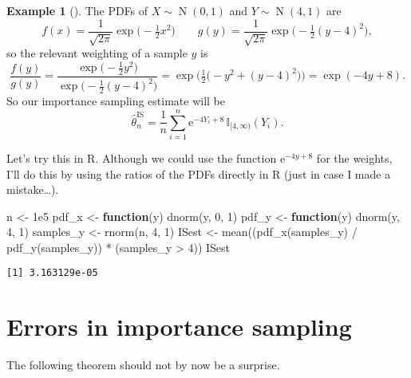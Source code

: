 \documentclass[
  letterpaper,
  DIV=11,
  numbers=noendperiod]{scrreprt}
\newenvironment{Shaded}{\begin{snugshade}}{\end{snugshade}}
\newcommand{\ControlFlowTok}[1]{\textcolor[rgb]{0.00,0.23,0.31}{\textbf{#1}}}
\newcommand{\DecValTok}[1]{\textcolor[rgb]{0.68,0.00,0.00}{#1}}
\newcommand{\FloatTok}[1]{\textcolor[rgb]{0.68,0.00,0.00}{#1}}
\newcommand{\FunctionTok}[1]{\textcolor[rgb]{0.28,0.35,0.67}{#1}}
\newcommand{\NormalTok}[1]{\textcolor[rgb]{0.00,0.23,0.31}{#1}}
\newcommand{\OtherTok}[1]{\textcolor[rgb]{0.00,0.23,0.31}{#1}}
\newcommand{\SpecialCharTok}[1]{\textcolor[rgb]{0.37,0.37,0.37}{#1}}
\theoremstyle{plain}
\theoremstyle{definition}
\theoremstyle{definition}
\newtheorem{example}{Example}[chapter]
\theoremstyle{remark}
\begin{document}
\begin{example}[]
The PDFs of \(X \sim \operatorname{N}(0,1)\) and
\(Y \sim \operatorname{N}(4,1)\) are
\[f(x) = \frac{1}{\sqrt{2\pi}} \exp\big(-\tfrac12 x^2\big) \qquad g(y) = \frac{1}{\sqrt{2\pi}} \exp\big(-\tfrac12 (y-4)^2\big) , \]
so the relevant weighting of a sample \(y\) is
\[ \frac{f(y)}{g(y)} = \frac{\exp\big(-\tfrac12 y^2\big)}{\exp\big(-\tfrac12 (y-4)^2\big)} = \exp \big(\tfrac12\big(-y^2 + (y-4)^2\big)\big) = \exp(-4y+8) .  \]
So our importance sampling estimate will be
\[ \widehat{\theta}_n^{\mathrm{IS}} = \frac{1}{n} \sum_{i=1}^n \mathrm{e}^{-4Y_i +8} \, \mathbb I_{[4,\infty)}(Y_i) . \]

Let's try this in R. Although we could use the function
\(\mathrm{e}^{-4y+8}\) for the weights, I'll do this by using the ratios
of the PDFs directly in R (just in case I made a mistake\ldots).

\begin{Shaded}
\begin{Highlighting}[]
\NormalTok{n }\OtherTok{\textless{}{-}} \FloatTok{1e5}
\NormalTok{pdf\_x }\OtherTok{\textless{}{-}} \ControlFlowTok{function}\NormalTok{(y) }\FunctionTok{dnorm}\NormalTok{(y, }\DecValTok{0}\NormalTok{, }\DecValTok{1}\NormalTok{)}
\NormalTok{pdf\_y }\OtherTok{\textless{}{-}} \ControlFlowTok{function}\NormalTok{(y) }\FunctionTok{dnorm}\NormalTok{(y, }\DecValTok{4}\NormalTok{, }\DecValTok{1}\NormalTok{)}
\NormalTok{samples\_y }\OtherTok{\textless{}{-}} \FunctionTok{rnorm}\NormalTok{(n, }\DecValTok{4}\NormalTok{, }\DecValTok{1}\NormalTok{)}
\NormalTok{ISest }\OtherTok{\textless{}{-}} \FunctionTok{mean}\NormalTok{((}\FunctionTok{pdf\_x}\NormalTok{(samples\_y) }\SpecialCharTok{/} \FunctionTok{pdf\_y}\NormalTok{(samples\_y)) }\SpecialCharTok{*}\NormalTok{ (samples\_y }\SpecialCharTok{\textgreater{}} \DecValTok{4}\NormalTok{))}
\NormalTok{ISest}
\end{Highlighting}
\end{Shaded}

\begin{verbatim}
[1] 3.163129e-05
\end{verbatim}

\end{example}

\section{Errors in importance
sampling}\label{errors-in-importance-sampling}

The following theorem should not by now be a surprise.
\end{document}
